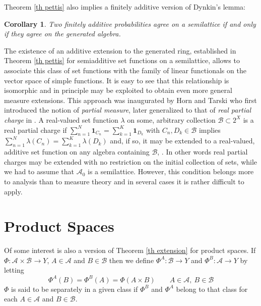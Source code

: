 \documentclass[11pt]{amsart}
\theoremstyle{plain}
\newtheorem{corollary}{Corollary}
\begin{document}
Theorem \ref{th pettis} also implies a finitely additive version of Dynkin's lemma:

\begin{corollary} 
\label{corollary Dynkin} 
Two finitely additive probabilities agree on a semilattice if and only if they agree on the 
generated algebra.
\end{corollary}

The existence of an additive extension to the generated ring, established in Theorem 
\ref{th pettis} for semiadditive set functions on a semilattice, allows to associate this 
class of set functions with the family of linear functionals on the vector space of simple 
functions. It is easy to see that this relationship is isomorphic and in principle may be 
exploited to obtain even more general measure extensions. This approach was inaugurated 
by Horn and Tarski \cite[Definition 1.6, p. 471]{horn tarski} who first introduced  the 
notion of \textit{partial measure}, later generalized to that of \textit{real partial charge} 
in \cite[Definition 3.2.1, p. 64]{rao}. A real-valued set function $\lambda$ on some, 
arbitrary collection $\mathscr B\subset 2^X$ is a real partial charge if 
$\sum_{n=1}^N{\mathbf{1}_{{C_n}}}=\sum_{k=1}^K{\mathbf{1}_{{D_k}}}$ with $C_n,D_k\in\mathscr B$ implies 
$\sum_{n=1}^N\lambda(C_n)=\sum_{k=1}^K\lambda(D_k)$ and, if so, it may be 
extended to a real-valued, additive set function on any algebra containing $\mathscr B$, 
\cite[Theorem 3.2.5, p. 65]{rao}. In other words real partial charges may be extended 
with no restriction on the initial collection of sets, while we had to assume that ${\mathscr{A}}_0$ is 
a semilattice. However, this condition belongs more to analysis than to measure theory 
and in several cases it is rather difficult to apply. 

\section{Product Spaces}
\label{sec fubini}

Of some interest is also a version of Theorem \ref{th extension} for product 
spaces. If $\Phi:{{\mathscr{A}}_{{}}\times\mathscr B_{{}}}\to Y$, $A\in{\mathscr{A}}$ and $B\in\mathscr B$ then we define 
$\Phi^A:\mathscr B\to Y$ and $\Phi^B:{\mathscr{A}}\to Y$ by letting
\begin{equation*}
\Phi^A(B)=\Phi^B(A)=\Phi(A\times B)\qquad A\in{\mathscr{A}},\ B\in\mathscr B
\end{equation*}
$\Phi$ is said to be separately in a given class if $\Phi^B$ and $\Phi^A$ belong 
to that class for each $A\in{\mathscr{A}}$ and $B\in\mathscr B$.
\end{document}

